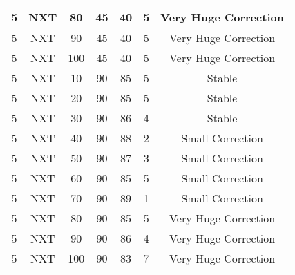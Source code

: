 \begin{longtable}[c]{|ccccccc|}
5  & NXT  & 80     & 45    & 40                & 5          & Very Huge Correction    \\\hline
5  & NXT  & 90     & 45    & 40                & 5          & Very Huge Correction    \\\hline
5  & NXT  & 100    & 45    & 40                & 5          & Very Huge Correction    \\\hline
5  & NXT  & 10     & 90    & 85                & 5          & Stable                  \\\hline
5  & NXT  & 20     & 90    & 85                & 5          & Stable                  \\\hline
5  & NXT  & 30     & 90    & 86                & 4          & Stable                  \\\hline
5  & NXT  & 40     & 90    & 88                & 2          & Small Correction        \\\hline
5  & NXT  & 50     & 90    & 87                & 3          & Small Correction        \\\hline
5  & NXT  & 60     & 90    & 85                & 5          & Small Correction        \\\hline
5  & NXT  & 70     & 90    & 89                & 1          & Small Correction        \\\hline
5  & NXT  & 80     & 90    & 85                & 5          & Very Huge Correction    \\\hline
5  & NXT  & 90     & 90    & 86                & 4          & Very Huge Correction    \\\hline
5  & NXT  & 100    & 90    & 83                & 7          & Very Huge Correction    \\\hline
\end{longtable}
